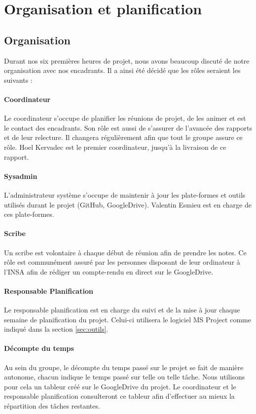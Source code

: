 \section{Organisation et planification}
	\subsection{Organisation}
	    Durant nos six premières heures de projet, nous avons beaucoup discuté de notre organisation avec nos encadrants. Il a ainsi été décidé que les rôles seraient les suivants :
	    \paragraph{Coordinateur} Le coordinateur s'occupe de planifier les réunions de projet, de les animer et est le contact des encadrants. Son rôle est aussi de s'assurer de l'avancée des rapports et de leur relecture. Il changera régulièrement afin que tout le groupe assure ce rôle. Hoel Kervadec est le premier coordinateur, jusqu'à la livraison de ce rapport.
	    \paragraph{Sysadmin} L'administrateur système s'occupe de maintenir à jour les plate-formes et outils utilisés durant le projet (GitHub, GoogleDrive). Valentin Esmieu est en charge de ces plate-formes.
	    \paragraph{Scribe} Un scribe est volontaire à chaque début de réunion afin de prendre les notes. Ce rôle est communément assuré par les personnes disposant de leur ordinateur à l'INSA afin de rédiger un compte-rendu en direct sur le GoogleDrive.
	    \paragraph{Responsable Planification} Le responsable planification est en charge du suivi et de la mise à jour chaque semaine de planification du projet. Celui-ci utilisera le logiciel MS Project comme indiqué dans la section \ref{sec:outils}.
	    \paragraph{Décompte du temps} Au sein du groupe, le décompte du temps passé sur le projet se fait de manière autonome, chacun indique le temps passé sur telle ou telle tâche. Nous utilisons pour cela un tableur créé sur le GoogleDrive du projet. Le coordinateur et le responsable planification consulteront ce tableur afin d'effectuer au mieux la répartition des tâches restantes.

